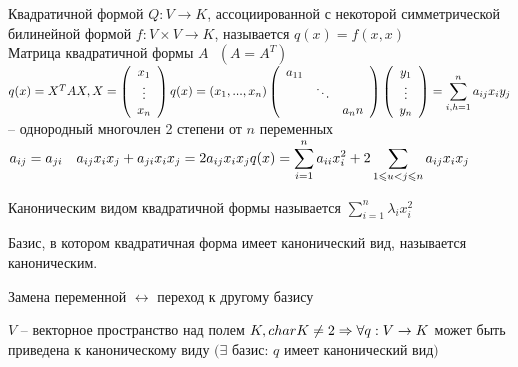 \begin{Def} 
	Квадратичной формой $Q: V \to K$, ассоциированной с некоторой симметрической билинейной формой $f: V \times V \to K$, называется $q(x)=f(x,x)$\\
	Матрица квадратичной формы $A \ \ \ (A = A^T)$ \ \ \ $q(x) = X^TAX, X = \left(
		\begin{array}{ccc}	
			x_1\\
			\vdots\\
			x_n
		\end{array}\right)\\
		q(x) = (x_1, ..., x_n)\left(
			\begin{array}{ccc}	
				a_{11} & & \\
				& \ddots & \\
				& &a_nn
			\end{array}\right)\left(
			\begin{array}{ccc}	
				y_1\\
				\vdots\\
				y_n
			\end{array}\right) = \displaystyle \sum_{i,h = 1}^{n} a_{ij}x_iy_j$ -- однородный многочлен 2 степени от $n$ переменных\\
			$a_{ij} = a_{ji} \ \ \ a_{ij}x_ix_j+a_{ji}x_ix_j = 2a_{ij}x_ix_j\\
			\displaystyle q(x) = \sum_{i=1}^{n} a_{ii} x_i^2 + 2 \sum_{1 \leqslant u < j \leqslant n} a_{ij} x_ix_j$
\end{Def} 

\begin{Def} 
	Каноническим видом квадратичной формы называется $\displaystyle \sum_{i=1}^{n} \lambda_i x^2_i $
\end{Def} 

\begin{Def} 
	Базис, в котором квадратичная форма имеет канонический вид, называется каноническим.
\end{Def} 

\begin{Rem}
	Замена переменной $\leftrightarrow$ переход к другому базису
\end{Rem}

\begin{Thm} 
	$V$ -- векторное пространство над полем $K, \\ char K \neq 2 \Rightarrow
	\forall q: V \to K$ может быть приведена к каноническому виду $(\exists$ базис: $q$ имеет канонический вид$)$
\end{Thm} 

